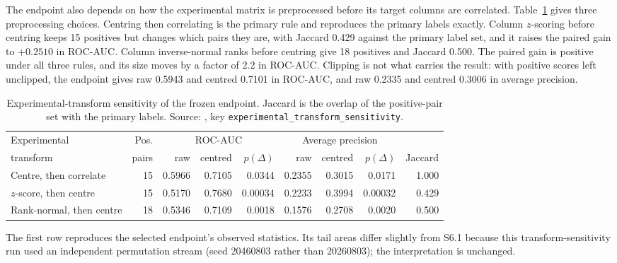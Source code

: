 The endpoint also depends on how the experimental matrix is preprocessed before its target
columns are correlated. Table~\ref{tab:s6-transform} gives three preprocessing choices. Centring
then correlating is the primary rule and reproduces the primary labels exactly. Column
$z$-scoring before centring keeps 15 positives but changes which pairs they are, with Jaccard
0.429 against the primary label set, and it raises the paired gain to $+0.2510$ in ROC-AUC.
Column inverse-normal ranks before centring give 18 positives and Jaccard 0.500. The paired gain
is positive under all three rules, and its size moves by a factor of 2.2 in ROC-AUC. Clipping is
not what carries the result: with positive scores left unclipped, the endpoint gives raw 0.5943
and centred 0.7101 in ROC-AUC, and raw 0.2335 and centred 0.3006 in average precision.

\begin{table}[htbp]
\centering
\small
\setlength{\tabcolsep}{4pt}
\caption[Experimental-transform sensitivity of the frozen endpoint]{Experimental-transform sensitivity of the frozen endpoint. Jaccard is the overlap of the
positive-pair set with the primary labels. Source:
, key
\texttt{experimental\_transform\_sensitivity}.}
\label{tab:s6-transform}
\begin{tabular}{lrrrrrrrr}
\toprule
Experimental & Pos. & \multicolumn{3}{c}{ROC-AUC} & \multicolumn{3}{c}{Average precision} & \\
\cmidrule(lr){3-5}\cmidrule(lr){6-8}
transform & pairs & raw & centred & $p(\Delta)$ & raw & centred & $p(\Delta)$ & Jaccard \\
\midrule
Centre, then correlate       & 15 & 0.5966 & 0.7105 & 0.0344   & 0.2355 & 0.3015 & 0.0171   & 1.000 \\
$z$-score, then centre       & 15 & 0.5170 & 0.7680 & 0.00034  & 0.2233 & 0.3994 & 0.00032  & 0.429 \\
Rank-normal, then centre     & 18 & 0.5346 & 0.7109 & 0.0018   & 0.1576 & 0.2708 & 0.0020   & 0.500 \\
\bottomrule
\end{tabular}
\end{table}

The first row reproduces the selected endpoint's observed statistics. Its tail areas differ
slightly from S6.1 because this transform-sensitivity run used an independent permutation stream
(seed 20460803 rather than 20260803); the interpretation is unchanged.


